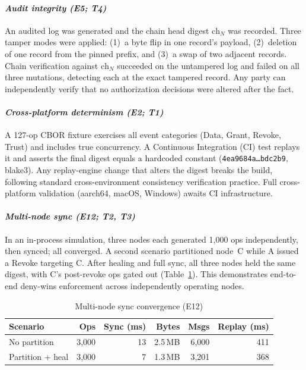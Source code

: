 \documentclass[10pt,journal,compsoc]{IEEEtran}
\begin{document}
\paragraph*{\textit{Audit integrity (E5; T4)}}
An audited log was generated and the chain head digest $\mathrm{ch}_N$ was recorded. Three tamper modes were applied: (1)~a byte flip in one record's payload, (2)~deletion of one record from the pinned prefix, and (3)~a swap of two adjacent records. Chain verification against $\mathrm{ch}_N$ succeeded on the untampered log and failed on all three mutations, detecting each at the exact tampered record. Any party can independently verify that no authorization decisions were altered after the fact.

\paragraph*{\textit{Cross-platform determinism (E2; T1)}}
A 127-op CBOR fixture exercises all event categories (Data, Grant, Revoke, Trust) and includes true concurrency. A Continuous Integration (CI) test replays it and asserts the final digest equals a hardcoded constant (\texttt{\small 4ea9684a\ldots bdc2b9}, blake3). Any replay-engine change that alters the digest breaks the build, following standard cross-environment consistency verification practice. Full cross-platform validation (aarch64, macOS, Windows) awaits CI infrastructure.

\paragraph*{\textit{Multi-node sync (E12; T2, T3)}}
In an in-process simulation, three nodes each generated 1{,}000 ops independently, then synced; all converged. A second scenario partitioned node~C while A issued a Revoke targeting C. After healing and full sync, all three nodes held the same digest, with C's post-revoke ops gated out (Table~\ref{tab:e12-sync}). This demonstrates end-to-end deny-wins enforcement across independently operating nodes.

\begin{table}[!htbp]
\centering
\caption{Multi-node sync convergence (E12)}
\label{tab:e12-sync}
\begin{tabular}{@{}lrrrrr@{}}
\toprule
\textbf{Scenario} & \textbf{Ops} & \textbf{Sync (ms)} & \textbf{Bytes} & \textbf{Msgs} & \textbf{Replay (ms)} \\
\midrule
No partition     & 3,000 & 13  & 2.5\,MB & 6,000 & 411 \\
Partition + heal & 3,000 & 7   & 1.3\,MB & 3,201 & 368 \\
\bottomrule
\end{tabular}
\end{table}
\end{document}
